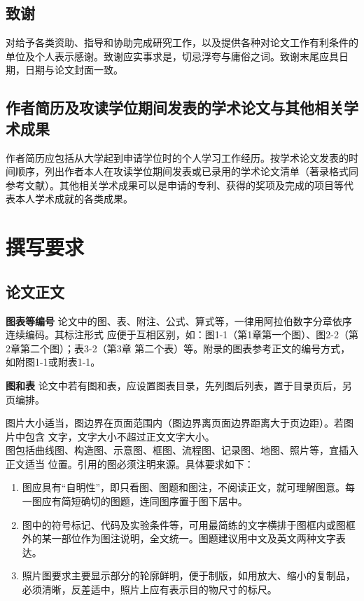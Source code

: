 \subsection{致谢}

对给予各类资助、指导和协助完成研究工作，以及提供各种对论文工作有利条件的单位及个人表示感谢。致谢应实事求是，切忌浮夸与庸俗之词。致谢末尾应具日期，日期与论文封面一致。

\subsection{作者简历及攻读学位期间发表的学术论文与其他相关学术成果}

作者简历应包括从大学起到申请学位时的个人学习工作经历。按学术论文发表的时间顺序，列出作者本人在攻读学位期间发表或已录用的学术论文清单（著录格式同参考文献）。其他相关学术成果可以是申请的专利、获得的奖项及完成的项目等代表本人学术成就的各类成果。

\section{撰写要求}

\subsection{论文正文}
\textbf{图表等编号} 论文中的图、表、附注、公式、算式等，一律用阿拉伯数字分章依序连续编码。其标注形式
应便于互相区别，如：图1-1（第1章第一个图）、图2-2（第2章第二个图）；表3-2（第3章
第二个表）等。附录的图表参考正文的编号方式，如附图1-1或附表1-1。

\textbf{图和表} 论文中若有图和表，应设置图表目录，先列图后列表，置于目录页后，另页编排。

图片大小适当，图边界在页面范围内（图边界离页面边界距离大于页边距）。若图片中包含
文字，文字大小不超过正文文字大小。\\
图包括曲线图、构造图、示意图、框图、流程图、记录图、地图、照片等，宜插入正文适当
位置。引用的图必须注明来源。具体要求如下：
\begin{enumerate}
    \item 图应具有“自明性”，即只看图、图题和图注，不阅读正文，就可理解图意。每一图应有简短确切的图题，连同图序置于图下居中。
    \item 图中的符号标记、代码及实验条件等，可用最简练的文字横排于图框内或图框外的某一部位作为图注说明，全文统一。图题建议用中文及英文两种文字表达。
    \item 照片图要求主要显示部分的轮廓鲜明，便于制版，如用放大、缩小的复制品，必须清晰，反差适中，照片上应有表示目的物尺寸的标尺。
\end{enumerate}
